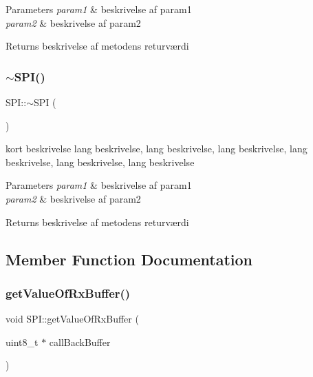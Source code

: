 \begin{DoxyParams}{Parameters}
{\em param1} & beskrivelse af param1 \\
\hline
{\em param2} & beskrivelse af param2 \\
\hline
\end{DoxyParams}
\begin{DoxyReturn}{Returns}
beskrivelse af metodens returværdi 
\end{DoxyReturn}
\mbox{\label{classSPI_a6babebf1ea3e8ff0330f43a3e2312ac4}} 
\subsubsection{\texorpdfstring{$\sim$\+S\+P\+I()}{~SPI()}}
{\footnotesize\ttfamily S\+P\+I\+::$\sim$\+S\+PI (\begin{DoxyParamCaption}{ }\end{DoxyParamCaption})\hspace{0.3cm}{\ttfamily [virtual]}}



kort beskrivelse lang beskrivelse, lang beskrivelse, lang beskrivelse, lang beskrivelse, lang beskrivelse, lang beskrivelse 


\begin{DoxyParams}{Parameters}
{\em param1} & beskrivelse af param1 \\
\hline
{\em param2} & beskrivelse af param2 \\
\hline
\end{DoxyParams}
\begin{DoxyReturn}{Returns}
beskrivelse af metodens returværdi 
\end{DoxyReturn}


\subsection{Member Function Documentation}
\mbox{\label{classSPI_ad468d421e9c82453957c5ee7ea7d5b9d}} 
\subsubsection{\texorpdfstring{get\+Value\+Of\+Rx\+Buffer()}{getValueOfRxBuffer()}}
{\footnotesize\ttfamily void S\+P\+I\+::get\+Value\+Of\+Rx\+Buffer (\begin{DoxyParamCaption}\item[{uint8\+\_\+t $\ast$}]{call\+Back\+Buffer }\end{DoxyParamCaption})\hspace{0.3cm}{\ttfamily [virtual]}}



